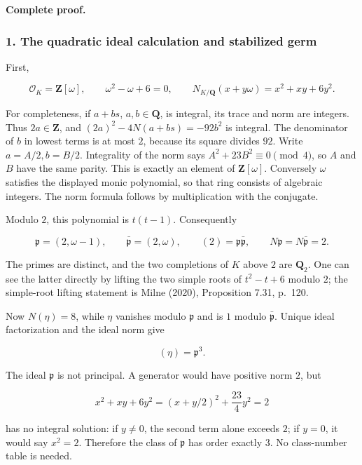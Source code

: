 \textbf{Complete proof.}

\subsubsection{1. The quadratic ideal calculation and stabilized
germ}\label{the-quadratic-ideal-calculation-and-stabilized-germ}

First,

\[
 \mathcal O_K=\mathbf Z[\omega],\qquad
 \omega^2-\omega+6=0,\qquad
 N_{K/\mathbf Q}(x+y\omega)=x^2+xy+6y^2.
 \tag{CC-AG.100}
\]

For completeness, if \(a+bs\), \(a,b\in\mathbf Q\), is integral, its
trace and norm are integers. Thus \(2a\in\mathbf Z\), and
\((2a)^2-4N(a+bs)=-92b^2\) is integral. The denominator of \(b\) in
lowest terms is at most \(2\), because its square divides \(92\). Write
\(a=A/2,b=B/2\). Integrality of the norm says
\(A^2+23B^2\equiv0\pmod4\), so \(A\) and \(B\) have the same parity.
This is exactly an element of \(\mathbf Z[\omega]\). Conversely
\(\omega\) satisfies the displayed monic polynomial, so that ring
consists of algebraic integers. The norm formula follows by
multiplication with the conjugate.

Modulo \(2\), this polynomial is \(t(t-1)\). Consequently

\[
 \mathfrak p=(2,\omega-1),\qquad
 \bar{\mathfrak p}=(2,\omega),\qquad
 (2)=\mathfrak p\bar{\mathfrak p},
 \qquad N\mathfrak p=N\bar{\mathfrak p}=2.
 \tag{CC-AG.101}
\]

The primes are distinct, and the two completions of \(K\) above \(2\)
are \(\mathbf Q_2\). One can see the latter directly by lifting the two
simple roots of \(t^2-t+6\) modulo \(2\); the simple-root lifting
statement is Milne (2020), Proposition 7.31, p.~120.

Now \(N(\eta)=8\), while \(\eta\) vanishes modulo \(\mathfrak p\) and is
\(1\) modulo \(\bar{\mathfrak p}\). Unique ideal factorization and the
ideal norm give

\[
 (\eta)=\mathfrak p^3.
 \tag{CC-AG.102}
\]

The ideal \(\mathfrak p\) is not principal. A generator would have
positive norm \(2\), but

\[
 x^2+xy+6y^2=(x+y/2)^2+\frac{23}{4}y^2=2
\]

has no integral solution: if \(y\ne0\), the second term alone exceeds
\(2\); if \(y=0\), it would say \(x^2=2\). Therefore the class of
\(\mathfrak p\) has order exactly \(3\). No class-number table is
needed.

